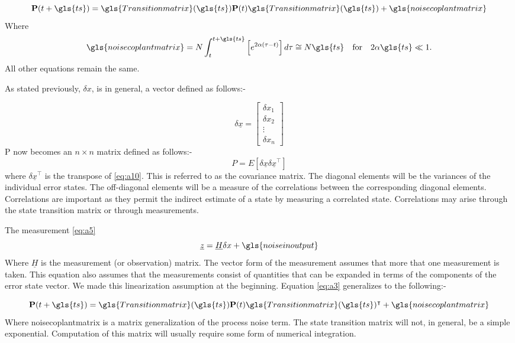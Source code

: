 \begin{equation}
{\bf P}(t + \gls{ts}) =  \gls{Transitionmatrix}(\gls{ts}){\bf P}(t)\gls{Transitionmatrix}(\gls{ts}) + \gls{noisecoplantmatrix}
\end{equation}
Where
\begin{equation}
\gls{noisecoplantmatrix} = N\int_{t}^{t+\gls{ts}}\left[e^{2\alpha(\tau-t)}\right]d\tau \cong N\gls{ts}~~~\mathrm{for}~~~2\alpha\gls{ts} \ll 1.
\end{equation}
All other equations remain the same.

As stated previously, $\delta x$, is in general,  a vector defined as follows:-

\begin{equation}
\delta \underline{x} = \begin{bmatrix}
\delta x_1\\
\delta x_2\\
\vdots\\
\delta x_n
\end{bmatrix}
\end{equation}
\label{eq:a10}
P now becomes an $n\times n$ matrix defined as follows:-
\begin{equation}
P=E[\delta \underline{x}\delta \underline{x}^\intercal]
\end{equation}
where $\delta \underline{x}^\intercal$ is the transpose of \eqref{eq:a10}. This is referred to as the covariance matrix. The diagonal elements will be the variances of the individual error states. The off-diagonal elements will be a measure of the correlations between the corresponding diagonal elements. Correlations are important as they permit the indirect estimate of a state by measuring a correlated state. Correlations may arise through the state transition matrix or through measurements.

The measurement \eqref{eq:a5}
\begin{equation}
\underline{z} = \underline{H} \delta x + \gls{noiseinoutput}
\end{equation}
Where $\underline{H}$ is the measurement (or observation) matrix. The vector form of the measurement assumes that more that one measurement is taken. This equation also assumes that the measurements consist of quantities that can be expanded in terms of the components of the error state vector. We made this linearization assumption at the beginning. Equation \ref{eq:a3} generalizes to the following:-

\begin{equation}
{\bf P}(t + \gls{ts}) =  \gls{Transitionmatrix}(\gls{ts}){\bf P}(t)\gls{Transitionmatrix}(\gls{ts})^\intercal + \gls{noisecoplantmatrix}
\end{equation}
Where \gls{noisecoplantmatrix} is a matrix generalization of the process noise term. The state transition matrix will not, in general, be a simple exponential. Computation of this matrix will usually require some form of numerical integration.

